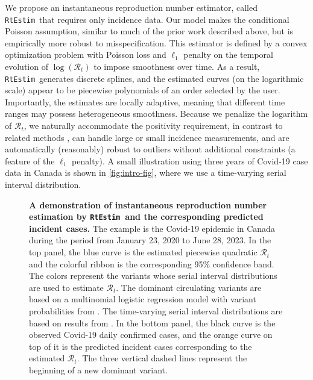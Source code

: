 \documentclass[10pt,letterpaper]{article}
\def\RtEstim{\texttt{RtEstim}}
\def\calR{\mathcal{R}}
\begin{document}
We propose an instantaneous reproduction number estimator, called \RtEstim\ that
requires only incidence data. Our model makes the conditional Poisson
assumption, similar to much of the prior work described above, but is
empirically more robust to misspecification. This estimator is defined by a
convex optimization problem with Poisson loss and $\ell_1$ penalty on the
temporal evolution of $\log(\calR_t)$ to impose smoothness over time. As a
result, \RtEstim\ generates discrete splines, and the estimated curves (on the
logarithmic scale) appear to be piecewise polynomials of an order selected by
the user. Importantly, the estimates are locally adaptive, meaning that
different time ranges may possess heterogeneous smoothness. Because we penalize
the logarithm of $\calR_t$, we naturally accommodate the positivity requirement,
in contrast to related methods \cite{abry2020spatial,pascal2022nonsmooth}, can
handle large or small incidence measurements, and are automatically (reasonably)
robust to outliers without additional constraints (a feature of the $\ell_1$
penalty). A small illustration using three years of Covid-19 case data in Canada
\cite{CovidTimelineCanada} is shown in \autoref{fig:intro-fig}, where we
use a time-varying serial interval distribution. 

\begin{figure}[!t]
  \centering
  \caption{{\bf A demonstration of instantaneous reproduction number estimation by
  \RtEstim\ and the corresponding predicted incident cases.} The example is the Covid-19
  epidemic in Canada during the period from January 23, 2020 to June 28, 2023.
  In the top panel, the blue curve is the estimated piecewise quadratic
  $\calR_t$ and the colorful ribbon is the corresponding 95\% confidence band.
  The colors represent the variants whose serial interval distributions are used
  to estimate $\calR_t$. The dominant circulating variants are based on a
  multinomial logistic regression model with variant probabilities from
  \cite{duotang_2023}. The time-varying serial interval distributions are 
  based on results from \cite{xu2023assessing}. 
  In the bottom panel, the black curve is the observed Covid-19
  daily confirmed cases, and the orange curve on top of it is the predicted
  incident cases corresponding to the estimated $\calR_t$. The three vertical
  dashed lines represent the beginning of a new dominant variant.}
  \label{fig:intro-fig}
\end{figure}
\end{document}
